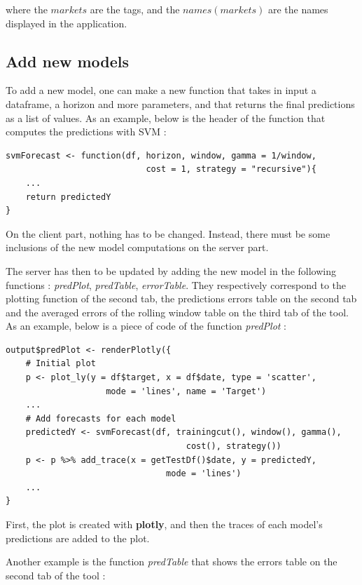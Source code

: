 \documentclass[11pt,a4paper,oneside]{book}
\begin{document}
where the $markets$ are the tags, and the $names(markets)$ are the names displayed in the application.


\subsection{Add new models}

To add a new model, one can make a new function that takes in input a dataframe, a horizon and more parameters, and that returns the final predictions as a list of values. As an example, below is the header of the function that computes the predictions with SVM : \\


\begin{lstlisting}
svmForecast <- function(df, horizon, window, gamma = 1/window, 
                            cost = 1, strategy = "recursive"){
    ...
    return predictedY
}
\end{lstlisting}


On the client part, nothing has to be changed. Instead, there must be some inclusions of the new model computations on the server part.

The server has then to be updated by adding the new model in the following functions : \textit{predPlot}, \textit{predTable}, \textit{errorTable}. They respectively correspond to the plotting function of the second tab, the predictions errors table on the second tab and the averaged errors of the rolling window table on the third tab of the tool. As an example, below is a piece of code of the function \textit{predPlot} : \\

\begin{lstlisting}
output$predPlot <- renderPlotly({
    # Initial plot
    p <- plot_ly(y = df$target, x = df$date, type = 'scatter',
                    mode = 'lines', name = 'Target')
    ...
    # Add forecasts for each model
    predictedY <- svmForecast(df, trainingcut(), window(), gamma(), 
                                    cost(), strategy())
    p <- p %>% add_trace(x = getTestDf()$date, y = predictedY, 
                                mode = 'lines')
    ...
}
\end{lstlisting}

First, the plot is created with \textbf{plotly}, and then the traces of each model's predictions are added to the plot. 

Another example is the function \textit{predTable} that shows the errors table on the second tab of the tool : \\
\end{document}

